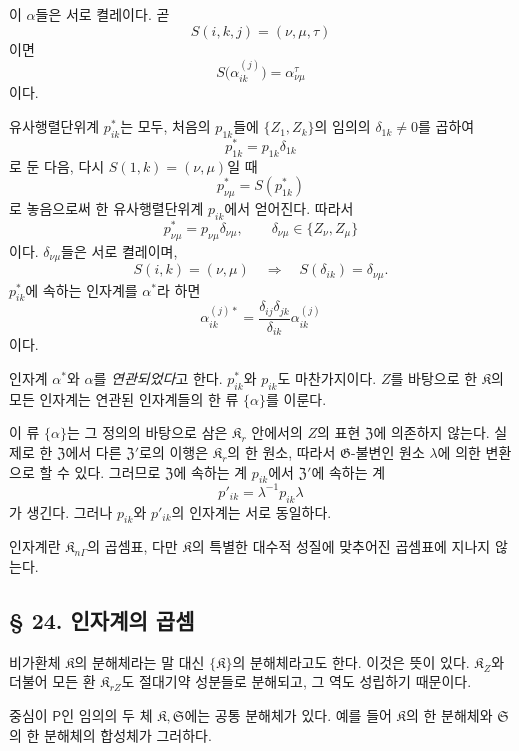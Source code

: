 이 \(\alpha\)들은 서로 켤레이다. 곧
\[
        S(i,k,j)=(\nu,\mu,\tau)
\]
이면
\[
        S\bigl(\alpha_{ik}^{(j)}\bigr)
        =\alpha_{\nu\mu}^{\tau}
\]
이다.

유사행렬단위계 \(p_{ik}^*\)는 모두, 처음의 \(p_{1k}\)들에 \(\{Z_1,Z_k\}\)의 임의의 \(\delta_{1k}\ne0\)를 곱하여
\[
        p_{1k}^*=p_{1k}\delta_{1k}
\]
로 둔 다음, 다시 \(S(1,k)=(\nu,\mu)\)일 때
\[
        p_{\nu\mu}^*=S(p_{1k}^*)
\]
로 놓음으로써 한 유사행렬단위계 \(p_{ik}\)에서 얻어진다. 따라서
\[
        p_{\nu\mu}^*=p_{\nu\mu}\delta_{\nu\mu},
        \qquad
        \delta_{\nu\mu}\in\{Z_\nu,Z_\mu\}
\]
이다. \(\delta_{\nu\mu}\)들은 서로 켤레이며,
\[
        S(i,k)=(\nu,\mu)
        \quad\Longrightarrow\quad
        S(\delta_{ik})=\delta_{\nu\mu}.
\]
\(p_{ik}^*\)에 속하는 인자계를 \(\alpha^*\)라 하면
\[
        \alpha_{ik}^{(j)*}
        =\frac{\delta_{ij}\delta_{jk}}{\delta_{ik}}
         \alpha_{ik}^{(j)}
\]
이다.

인자계 \(\alpha^*\)와 \(\alpha\)를 \emph{연관되었다}고 한다. \(p_{ik}^*\)와 \(p_{ik}\)도 마찬가지이다. \(Z\)를 바탕으로 한 \(\mathfrak K\)의 모든 인자계는 연관된 인자계들의 한 류 \(\{\alpha\}\)를 이룬다.

이 류 \(\{\alpha\}\)는 그 정의의 바탕으로 삼은 \(\mathfrak K_r\) 안에서의 \(Z\)의 표현 \(\mathfrak Z\)에 의존하지 않는다. 실제로 한 \(\mathfrak Z\)에서 다른 \(\mathfrak Z'\)로의 이행은 \(\mathfrak K_r\)의 한 원소, 따라서 \(\mathfrak G\)-불변인 원소 \(\lambda\)에 의한 변환으로 할 수 있다. 그러므로 \(\mathfrak Z\)에 속하는 계 \(p_{ik}\)에서 \(\mathfrak Z'\)에 속하는 계
\[
        p'_{ik}=\lambda^{-1}p_{ik}\lambda
\]
가 생긴다. 그러나 \(p_{ik}\)와 \(p'_{ik}\)의 인자계는 서로 동일하다.

인자계란 \(\mathfrak K_{n\Gamma}\)의 곱셈표, 다만 \(\mathfrak K\)의 특별한 대수적 성질에 맞추어진 곱셈표에 지나지 않는다.

\subsection*{§ 24. 인자계의 곱셈}

비가환체 \(\mathfrak K\)의 분해체라는 말 대신 \(\{\mathfrak K\}\)의 분해체라고도 한다. 이것은 뜻이 있다. \(\mathfrak K_Z\)와 더불어 모든 환 \(\mathfrak K_{rZ}\)도 절대기약 성분들로 분해되고, 그 역도 성립하기 때문이다.

중심이 \(\mathsf P\)인 임의의 두 체 \(\mathfrak K,\mathfrak S\)에는 공통 분해체가 있다. 예를 들어 \(\mathfrak K\)의 한 분해체와 \(\mathfrak S\)의 한 분해체의 합성체가 그러하다.

